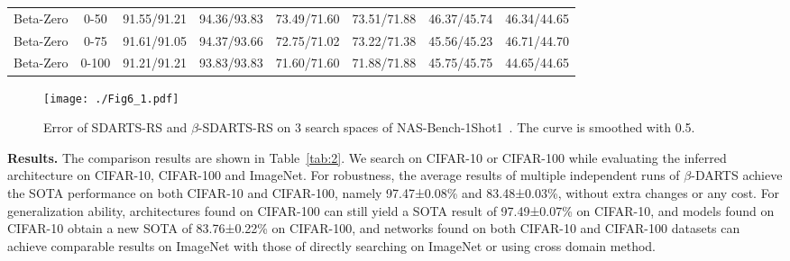 \documentclass[10pt,twocolumn,letterpaper]{article}
\begin{document}
\begin{table*}[t]
\begin{center}
\begin{tabular}{cccccccc}
Beta-Zero                  & 0-50                                                                        & 91.55/91.21   & 94.36/93.83  & 73.49/71.60   & 73.51/71.88   & 46.37/45.74      & 46.34/44.65     \\
Beta-Zero                  & 0-75                                                                        & 91.61/91.05   & 94.37/93.66  & 72.75/71.02   & 73.22/71.38   & 45.56/45.23      & 46.71/44.70     \\
Beta-Zero                  & 0-100                                                                       & 91.21/91.21   & 93.83/93.83  & 71.60/71.60   & 71.88/71.88   & 45.75/45.75      & 44.65/44.65     \\ \hline
\end{tabular}
\end{center}
\vspace{-12pt}
\end{table*}
\begin{figure*}[t] 
    \vspace{-3pt}	
	\centering
\texttt{[image: ./Fig6\_1.pdf]}
\vspace{-12pt}
	\caption{Error of SDARTS-RS and $\beta$-SDARTS-RS on 3 search spaces of NAS-Bench-1Shot1~\cite{1shot1}. The curve is smoothed with 0.5.}
	\label{fig:6}
	\vspace{-10pt}	
\end{figure*}


\noindent\textbf{Results.} The comparison results are shown in Table~\ref{tab:2}. We search on CIFAR-10 or CIFAR-100 while evaluating the inferred architecture on CIFAR-10, CIFAR-100 and ImageNet. For robustness, the average results of multiple independent runs of $\beta$-DARTS achieve the SOTA performance on both CIFAR-10 and CIFAR-100, namely 97.47±0.08\% and 83.48±0.03\%, without extra changes or any cost. For generalization ability, architectures found on CIFAR-100 can still yield a SOTA result of 97.49±0.07\% on CIFAR-10, and models found on CIFAR-10 obtain a new SOTA of 83.76±0.22\%  on CIFAR-100, and networks found on both CIFAR-10 and CIFAR-100 datasets can achieve comparable results on ImageNet with those of directly searching on ImageNet or using cross domain method. 
\end{document}
